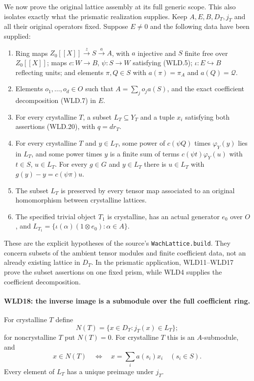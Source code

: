 \documentclass[11pt,a4paper]{article}
\numberwithin{equation}{section}
\theoremstyle{remark}\newtheorem{remark}[theorem]{Remark}
\begin{document}
We now prove the original lattice assembly at its full generic scope.
This also isolates exactly what the prismatic realization supplies.
Keep $A,E,B,D_T,j_T$ and all their original operators fixed.
Suppose $E\ne0$ and the following data have been supplied:
\begin{enumerate}
 \item Ring maps $Z_0[[X]]\xrightarrow{z}S\xrightarrow{a}A$,
 with $a$ injective and $S$ finite free over $Z_0[[X]]$;
 maps $c:W\to B$, $\psi:S\to W$ satisfying (WLD.5);
 $\iota:E\hookrightarrow B$ reflecting units;
 and elements $\pi,Q\in S$ with
 $a(\pi)=\pi_A$ and $a(Q)=\mathcal Q$.
 \item Elements $o_1,\ldots,o_d\in O$ such that
 $A=\sum_j o_ja(S)$, and the exact coefficient decomposition
 (WLD.7) in $E$.
 \item For every crystalline $T$, a subset $L_T\subseteq Y_T$
 and a tuple $x_i$ satisfying both assertions (WLD.20), with
 $q=dr_T$.
 \item For every crystalline $T$ and $y\in L_T$, some power
 of $c(\psi Q)$ times $\varphi_Y(y)$ lies in $L_T$, and some
 power times $y$ is a finite sum of terms
 $c(\psi t)\varphi_Y(u)$ with $t\in S$, $u\in L_T$.
 For every $g\in G$ and $y\in L_T$ there is $u\in L_T$ with
 $g(y)-y=c(\psi\pi)u$.
 \item The subset $L_T$ is preserved by every tensor map
 associated to an original homomorphism between crystalline lattices.
 \item The specified trivial object $T_1$ is crystalline, has an
 actual generator $e_0$ over $O$, and
 $L_{T_1}=\{\iota(\alpha)(1\otimes e_0):\alpha\in A\}$.
\end{enumerate}
These are the explicit hypotheses of the source's
\texttt{Wach\allowbreak Lattice.\allowbreak build}. They concern subsets of the ambient tensor
modules and finite coefficient data, not an already existing lattice
in $D_T$. In the prismatic application, WLD11--WLD17 prove the
subset assertions on one fixed prism, while WLD4 supplies the
coefficient decomposition.

\paragraph{WLD18: the inverse image is a submodule over the full coefficient ring.}
\label{claim:WLD18}
For crystalline $T$ define
\[
           N(T)=\{x\in D_T:j_T(x)\in L_T\};
\]
for noncrystalline $T$ put $N(T)=0$. For crystalline $T$ this is
an $A$-submodule, and
\[
 x\in N(T)\quad\Longleftrightarrow\quad
                       x=\sum_i a(s_i)x_i\quad(s_i\in S).
                                                               \tag{WLD.21}
\]
Every element of $L_T$ has a unique preimage under $j_T$.
\end{document}
